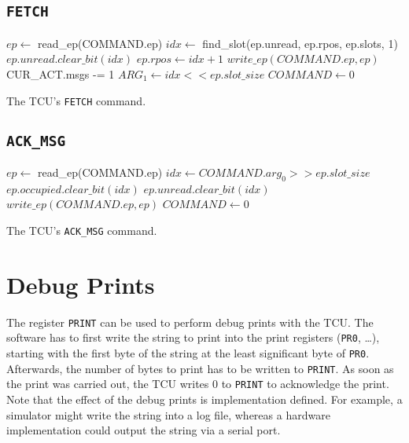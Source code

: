 \subsection{\texttt{FETCH}}

\begin{algorithm}[H]
    $ep \gets$ read\_ep(COMMAND.ep)\;
    \extend{}
    \BlankLine
    $idx \gets$ find\_slot(ep.unread, ep.rpos, ep.slots, 1)\;
    $ep.unread.clear\_bit(idx)$\;
    $ep.rpos \gets idx + 1$\;
    $write\_ep(COMMAND.ep, ep)$\;
    \BlankLine
    CUR\_ACT.msgs -= 1\;
    \extend{}
    \BlankLine
    $ARG_1 \gets idx << ep.slot\_size$\;
    $COMMAND \gets 0$\;
    \caption{The TCU's \texttt{FETCH} command.}
\end{algorithm}

\subsection{\texttt{ACK\_MSG}}

\begin{algorithm}[H]
    $ep \gets$ read\_ep(COMMAND.ep)\;
    \extend{}
    \BlankLine
    $idx \gets COMMAND.arg_0 >> ep.slot\_size$\;
    \BlankLine
    \extend{}
    \BlankLine
    $ep.occupied.clear\_bit(idx)$\;
    $ep.unread.clear\_bit(idx)$\;
    $write\_ep(COMMAND.ep, ep)$\;
    \BlankLine
    \BlankLine
    $COMMAND \gets 0$\;
    \caption{The TCU's \texttt{ACK\_MSG} command.}
\end{algorithm}

\section{Debug Prints}

The register \texttt{PRINT} can be used to perform debug prints with the TCU. The software has to
first write the string to print into the print registers (\texttt{PR0}, \dots), starting with the
first byte of the string at the least significant byte of \texttt{PR0}. Afterwards, the number of
bytes to print has to be written to \texttt{PRINT}. As soon as the print was carried out, the TCU
writes 0 to \texttt{PRINT} to acknowledge the print. Note that the effect of the debug prints is
implementation defined. For example, a simulator might write the string into a log file, whereas a
hardware implementation could output the string via a serial port.
